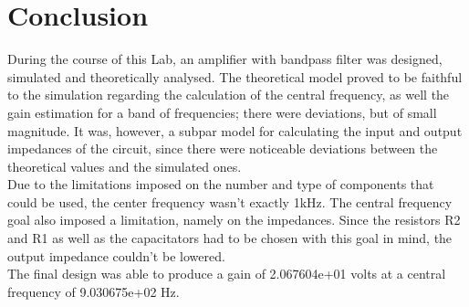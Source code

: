 \section{Conclusion}
\label{sec:conclusion} 
During the course of this Lab, an amplifier with bandpass filter was designed, simulated and theoretically analysed. The theoretical model proved to be faithful to the simulation regarding the calculation of the central frequency, as well the gain estimation for a band of frequencies; there were deviations, but of small magnitude. It was, however, a subpar model for calculating the input and output impedances of the circuit, since there were noticeable deviations between the theoretical values and the simulated ones.\\
Due to the limitations imposed on the number and type of components that could be used, the center frequency wasn't exactly 1kHz. The central frequency goal also imposed a limitation, namely on the impedances. Since the resistors R2 and R1 as well as the capacitators had to be chosen with this goal in mind, the output impedance couldn't be lowered.\\
The final design was able to produce a gain of 2.067604e+01 volts at a central frequency of 9.030675e+02 Hz.\\
